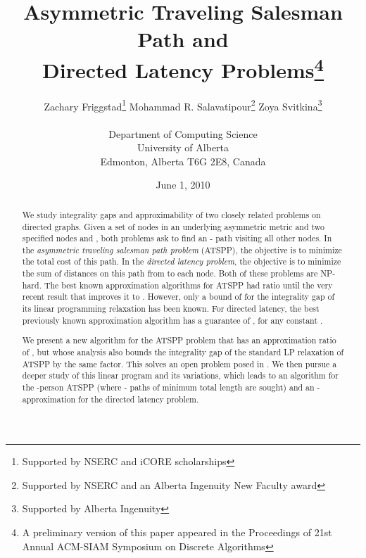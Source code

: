 \documentclass[11pt]{article}
\begin{document}
\title{\Large Asymmetric Traveling Salesman Path and\\ Directed Latency Problems\footnote{A preliminary 
version of this paper appeared in the Proceedings of 21st Annual ACM-SIAM Symposium on 
Discrete Algorithms}}
\author{
Zachary Friggstad\thanks{Supported by NSERC and iCORE scholarships} \hspace{12mm}
Mohammad R. Salavatipour\thanks{Supported by NSERC and an Alberta Ingenuity New Faculty award} \hspace{12mm}
Zoya Svitkina\thanks{Supported by Alberta Ingenuity}\\
\\
\small{Department of Computing Science}\\ 
\small{University of Alberta}\\
\small{Edmonton, Alberta T6G 2E8, Canada}
}

\date{June 1, 2010}
\maketitle


\begin{abstract} 

We study integrality gaps and approximability of two closely related problems on directed graphs. 
Given a set  of  nodes in an underlying asymmetric metric and two
specified nodes  and , both problems ask to find an - path visiting all other nodes. In 
the {\em asymmetric traveling salesman path problem} (ATSPP), the objective is to minimize the total cost of this path. In the {\em directed latency problem}, the objective is to minimize the sum of distances on this path from  to each node.  Both of these problems are NP-hard. 
The best known approximation algorithms for ATSPP had 
ratio  \cite{chekuri:pal:atspp,feige:singh} until the very recent result that improves it to  \cite{asadpour:atsp,feige:singh}. However, only a bound of  for the integrality gap of its linear programming relaxation has been known. For directed latency, the best previously known approximation algorithm has a guarantee 
of , for any constant  \cite{nagarajan:ravi:latency}. 


We present a new algorithm for the ATSPP problem that has an approximation ratio of , 
but whose analysis also bounds the integrality gap of the standard LP relaxation of ATSPP by the same factor. This solves an open problem posed in \cite{chekuri:pal:atspp}.  We then pursue
a deeper study of this linear program and its variations, which leads to an algorithm for the -person ATSPP (where  - paths of minimum total length are sought) and an -approximation for the directed latency problem.  


\end{abstract}
\end{document}
